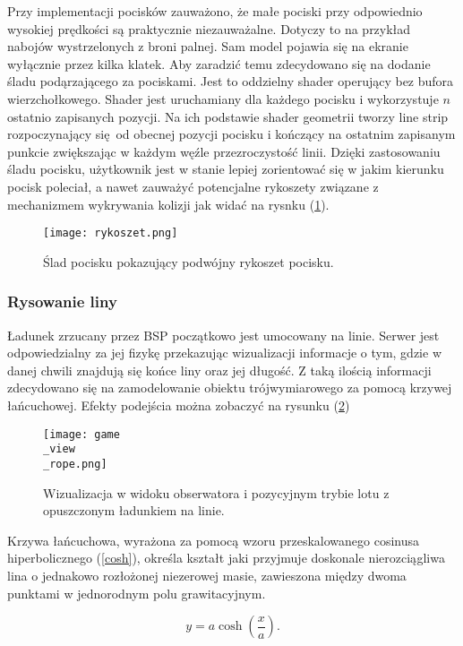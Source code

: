 Przy implementacji pocisków zauważono, że małe pociski przy odpowiednio wysokiej prędkości są praktycznie niezauważalne. Dotyczy to na przykład nabojów wystrzelonych z broni palnej. Sam model pojawia się na ekranie wyłącznie przez kilka klatek. Aby zaradzić temu zdecydowano się na dodanie śladu podąrzającego za pociskami. Jest to oddzielny shader operujący bez bufora wierzchołkowego. Shader jest uruchamiany dla każdego pocisku i wykorzystuje $n$ ostatnio zapisanych pozycji. Na ich podstawie shader geometrii tworzy line strip rozpoczynający się od obecnej pozycji pocisku i kończący na ostatnim zapisanym punkcie zwiększając w każdym węźle przezroczystość linii. Dzięki zastosowaniu śladu pocisku, użytkownik jest w stanie lepiej zorientować się w jakim kierunku pocisk poleciał, a nawet zauważyć potencjalne rykoszety związane z mechanizmem wykrywania kolizji jak widać na rysnku (\ref{rykoszet}).

\begin{figure}[h]
	\centering
	\texttt{[image: rykoszet.png]}
	\caption{Ślad pocisku pokazujący podwójny rykoszet pocisku.}
	\label{rykoszet}
\end{figure}

\subsubsection{Rysowanie liny}

Ładunek zrzucany przez BSP początkowo jest umocowany na linie. Serwer jest odpowiedzialny za jej fizykę przekazując wizualizacji informacje o tym, gdzie w danej chwili znajdują się końce liny oraz jej długość. Z taką ilością informacji zdecydowano się na zamodelowanie obiektu trójwymiarowego za pomocą krzywej łańcuchowej. Efekty podejścia można zobaczyć na rysunku (\ref{gui_game4})
\\

\begin{figure}[!h]
	\centering
	\texttt{[image: game\\\_view\\\_rope.png]}
	\caption{Wizualizacja w widoku obserwatora i pozycyjnym trybie lotu z opuszczonym ładunkiem na linie.}
	\label{gui_game4}
\end{figure}

Krzywa łańcuchowa, wyrażona za pomocą wzoru przeskalowanego cosinusa hiperbolicznego (\ref{cosh}), określa kształt jaki przyjmuje doskonale nierozciągliwa lina o jednakowo rozłożonej niezerowej masie, zawieszona między dwoma punktami w jednorodnym polu grawitacyjnym.

\begin{equation}
	\label{cosh}
	y = a \cosh \left( \frac{x}{a} \right).
\end{equation}

